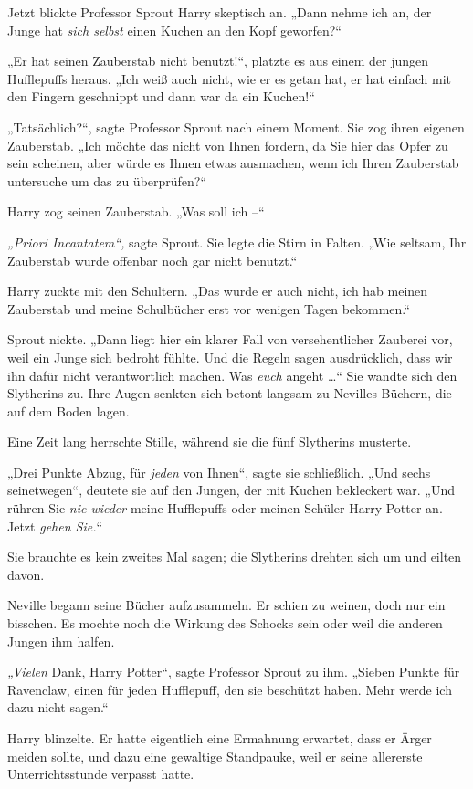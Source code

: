 Jetzt blickte Professor Sprout Harry skeptisch an. „Dann nehme ich an, der Junge hat \emph{sich selbst} einen Kuchen an den Kopf geworfen?“ 

„Er hat seinen Zauberstab nicht benutzt!“, platzte es aus einem der jungen Hufflepuffs heraus. „Ich weiß auch nicht, wie er es getan hat, er hat einfach mit den Fingern geschnippt und dann war da ein Kuchen!“ 

„Tatsächlich?“, sagte Professor Sprout nach einem Moment. Sie zog ihren eigenen Zauberstab. „Ich möchte das nicht von Ihnen fordern, da Sie hier das Opfer zu sein scheinen, aber würde es Ihnen etwas ausmachen, wenn ich Ihren Zauberstab untersuche um das zu überprüfen?“ 

Harry zog seinen Zauberstab. „Was soll ich –“ 

\emph{„Priori Incantatem“,} sagte Sprout. Sie legte die Stirn in Falten. „Wie seltsam, Ihr Zauberstab wurde offenbar noch gar nicht benutzt.“ 

Harry zuckte mit den Schultern. „Das wurde er auch nicht, ich hab meinen Zauberstab und meine Schulbücher erst vor wenigen Tagen bekommen.“ 

Sprout nickte. „Dann liegt hier ein klarer Fall von versehentlicher Zauberei vor, weil ein Junge sich bedroht fühlte. Und die Regeln sagen ausdrücklich, dass wir ihn dafür nicht verantwortlich machen. Was \emph{euch} angeht …“ Sie wandte sich den Slytherins zu. Ihre Augen senkten sich betont langsam zu Nevilles Büchern, die auf dem Boden lagen. 

Eine Zeit lang herrschte Stille, während sie die fünf Slytherins musterte. 

„Drei Punkte Abzug, für \emph{jeden} von Ihnen“, sagte sie schließlich. „Und sechs seinetwegen“, deutete sie auf den Jungen, der mit Kuchen bekleckert war. „Und rühren Sie \emph{nie wieder} meine Hufflepuffs oder meinen Schüler Harry Potter an. Jetzt \emph{gehen Sie.}“ 

Sie brauchte es kein zweites Mal sagen; die Slytherins drehten sich um und eilten davon. 

Neville begann seine Bücher aufzusammeln. Er schien zu weinen, doch nur ein bisschen. Es mochte noch die Wirkung des Schocks sein oder weil die anderen Jungen ihm halfen. 

\emph{„Vielen} Dank, Harry Potter“, sagte Professor Sprout zu ihm. „Sieben Punkte für Ravenclaw, einen für jeden Hufflepuff, den sie beschützt haben. Mehr werde ich dazu nicht sagen.“ 

Harry blinzelte. Er hatte eigentlich eine Ermahnung erwartet, dass er Ärger meiden sollte, und dazu eine gewaltige Standpauke, weil er seine allererste Unterrichtsstunde verpasst hatte. 

